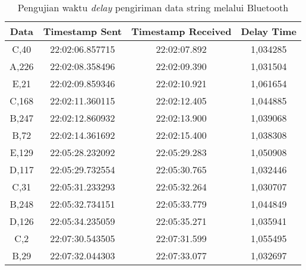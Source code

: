 \begin{table}[H]
\centering
  \caption{Pengujian waktu \emph{delay} pengiriman data string melalui Bluetooth}
  \label{tbl:delayBluetooth}
  \begin{tabular}{|ccc|c|}
    \hline
    \multicolumn{1}{|c|}{Data}  & \multicolumn{1}{c|}{Timestamp Sent}  & Timestamp Received & Delay Time                       \\ \hline
    \multicolumn{1}{|c|}{C,40}  & \multicolumn{1}{c|}{22:02:06.857715} & 22:02:07.892       & 1,034285                         \\ \hline
    \multicolumn{1}{|c|}{A,226} & \multicolumn{1}{c|}{22:02:08.358496} & 22:02:09.390       & 1,031504                         \\ \hline
    \multicolumn{1}{|c|}{E,21}  & \multicolumn{1}{c|}{22:02:09.859346} & 22:02:10.921       & 1,061654                         \\ \hline
    \multicolumn{1}{|c|}{C,168} & \multicolumn{1}{c|}{22:02:11.360115} & 22:02:12.405       & 1,044885                         \\ \hline
    \multicolumn{1}{|c|}{B,247} & \multicolumn{1}{c|}{22:02:12.860932} & 22:02:13.900       & 1,039068                         \\ \hline
    \multicolumn{1}{|c|}{B,72}  & \multicolumn{1}{c|}{22:02:14.361692} & 22:02:15.400       & 1,038308                         \\ \hline
    \multicolumn{1}{|c|}{E,129} & \multicolumn{1}{c|}{22:05:28.232092} & 22:05:29.283       & 1,050908                         \\ \hline
    \multicolumn{1}{|c|}{D,117} & \multicolumn{1}{c|}{22:05:29.732554} & 22:05:30.765       & 1,032446                         \\ \hline
    \multicolumn{1}{|c|}{C,31}  & \multicolumn{1}{c|}{22:05:31.233293} & 22:05:32.264       & 1,030707                         \\ \hline
    \multicolumn{1}{|c|}{B,248} & \multicolumn{1}{c|}{22:05:32.734151} & 22:05:33.779       & 1,044849                         \\ \hline
    \multicolumn{1}{|c|}{D,126} & \multicolumn{1}{c|}{22:05:34.235059} & 22:05:35.271       & 1,035941                         \\ \hline
    \multicolumn{1}{|c|}{C,2}   & \multicolumn{1}{c|}{22:07:30.543505} & 22:07:31.599       & 1,055495                         \\ \hline
    \multicolumn{1}{|c|}{B,29}  & \multicolumn{1}{c|}{22:07:32.044303} & 22:07:33.077       & 1,032697                         \\ \hline

\end{tabular}
\end{table}
